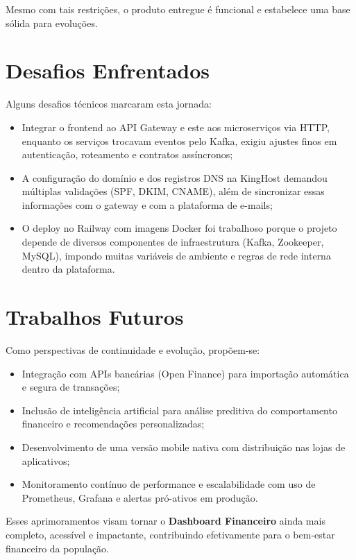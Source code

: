 Mesmo com tais restrições, o produto entregue é funcional e estabelece uma base sólida para evoluções.

\section{Desafios Enfrentados}

Alguns desafios técnicos marcaram esta jornada:
\begin{itemize}
    \item Integrar o frontend ao API Gateway e este aos microserviços via HTTP, enquanto os serviços trocavam eventos pelo Kafka, exigiu ajustes finos em autenticação, roteamento e contratos assíncronos;
    \item A configuração do domínio e dos registros DNS na KingHost demandou múltiplas validações (SPF, DKIM, CNAME), além de sincronizar essas informações com o gateway e com a plataforma de e-mails;
    \item O deploy no Railway com imagens Docker foi trabalhoso porque o projeto depende de diversos componentes de infraestrutura (Kafka, Zookeeper, MySQL), impondo muitas variáveis de ambiente e regras de rede interna dentro da plataforma.
\end{itemize}

\section{Trabalhos Futuros}

Como perspectivas de continuidade e evolução, propõem-se:
\begin{itemize}
    \item Integração com APIs bancárias (Open Finance) para importação automática e segura de transações;
    \item Inclusão de inteligência artificial para análise preditiva do comportamento financeiro e recomendações personalizadas;
    \item Desenvolvimento de uma versão mobile nativa com distribuição nas lojas de aplicativos;
    \item Monitoramento contínuo de performance e escalabilidade com uso de Prometheus, Grafana e alertas pró-ativos em produção.
\end{itemize}

Esses aprimoramentos visam tornar o \textbf{Dashboard Financeiro} ainda mais completo, acessível e impactante, contribuindo efetivamente para o bem-estar financeiro da população.
